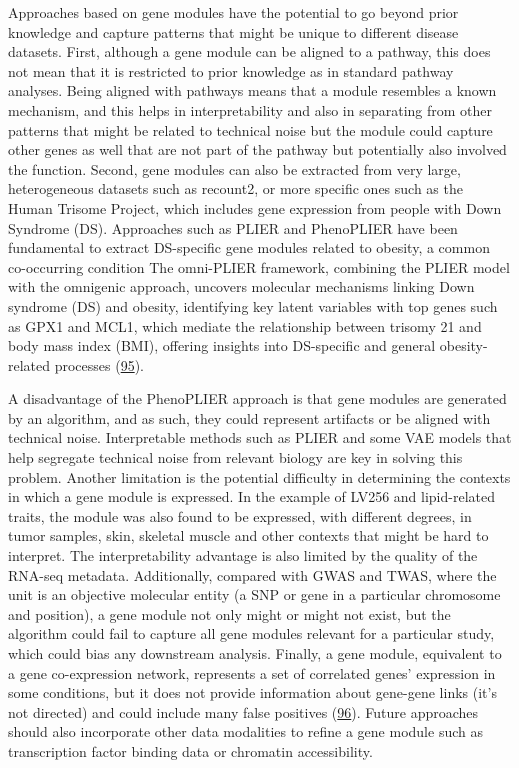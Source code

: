 Approaches based on gene modules have the potential to go beyond prior knowledge and capture patterns that might be unique to different disease datasets.
First, although a gene module can be aligned to a pathway, this does not mean that it is restricted to prior knowledge as in standard pathway analyses.
Being aligned with pathways means that a module resembles a known mechanism, and this helps in interpretability and also in separating from other patterns that might be related to technical noise but the module could capture other genes as well that are not part of the pathway but potentially also involved the function.
Second, gene modules can also be extracted from very large, heterogeneous datasets such as recount2, or more specific ones such as the Human Trisome Project, which includes gene expression from people with Down Syndrome (DS).
Approaches such as PLIER and PhenoPLIER have been fundamental to extract DS-specific gene modules related to obesity, a common co-occurring condition The omni-PLIER framework, combining the PLIER model with the omnigenic approach, uncovers molecular mechanisms linking Down syndrome (DS) and obesity, identifying key latent variables with top genes such as GPX1 and MCL1, which mediate the relationship between trisomy 21 and body mass index (BMI), offering insights into DS-specific and general obesity-related processes (\protect\hyperlink{ref-B7FF0NeZ}{95}).

A disadvantage of the PhenoPLIER approach is that gene modules are generated by an algorithm, and as such, they could represent artifacts or be aligned with technical noise.
Interpretable methods such as PLIER and some VAE models that help segregate technical noise from relevant biology are key in solving this problem.
Another limitation is the potential difficulty in determining the contexts in which a gene module is expressed.
In the example of LV256 and lipid-related traits, the module was also found to be expressed, with different degrees, in tumor samples, skin, skeletal muscle and other contexts that might be hard to interpret.
The interpretability advantage is also limited by the quality of the RNA-seq metadata.
Additionally, compared with GWAS and TWAS, where the unit is an objective molecular entity (a SNP or gene in a particular chromosome and position), a gene module not only might or might not exist, but the algorithm could fail to capture all gene modules relevant for a particular study, which could bias any downstream analysis.
Finally, a gene module, equivalent to a gene co-expression network, represents a set of correlated genes' expression in some conditions, but it does not provide information about gene-gene links (it's not directed) and could include many false positives (\protect\hyperlink{ref-jVQ2rMqc}{96}).
Future approaches should also incorporate other data modalities to refine a gene module such as transcription factor binding data or chromatin accessibility.

